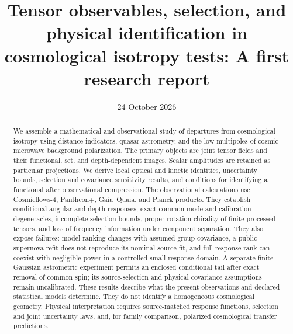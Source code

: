 \documentclass[aps,prd,preprint,onecolumn,nofootinbib,superscriptaddress]{revtex4-2}
\begin{document}
\title{Tensor observables, selection, and physical identification in cosmological isotropy tests: A first research report}
\date{24 October 2026}
\begin{abstract}
We assemble a mathematical and observational study of departures from cosmological isotropy using distance indicators, quasar astrometry, and the low multipoles of cosmic microwave background polarization. The primary objects are joint tensor fields and their functional, set, and depth-dependent images. Scalar amplitudes are retained as particular projections. We derive local optical and kinetic identities, uncertainty bounds, selection and covariance sensitivity results, and conditions for identifying a functional after observational compression. The observational calculations use Cosmicflows-4, Pantheon+, Gaia--Quaia, and Planck products. They establish conditional angular and depth responses, exact common-mode and calibration degeneracies, incomplete-selection bounds, proper-rotation chirality of finite processed tensors, and loss of frequency information under component separation. They also expose failures: model ranking changes with assumed group covariance, a public supernova refit does not reproduce its nominal source fit, and full response rank can coexist with negligible power in a controlled small-response domain. A separate finite Gaussian astrometric experiment permits an enclosed conditional tail after exact removal of common spin; its source-selection and physical covariance assumptions remain uncalibrated. These results describe what the present observations and declared statistical models determine. They do not identify a homogeneous cosmological geometry. Physical interpretation requires source-matched response functions, selection and joint uncertainty laws, and, for family comparison, polarized cosmological transfer predictions.
\end{abstract}
\maketitle
\tableofcontents






\appendix




\end{document}
